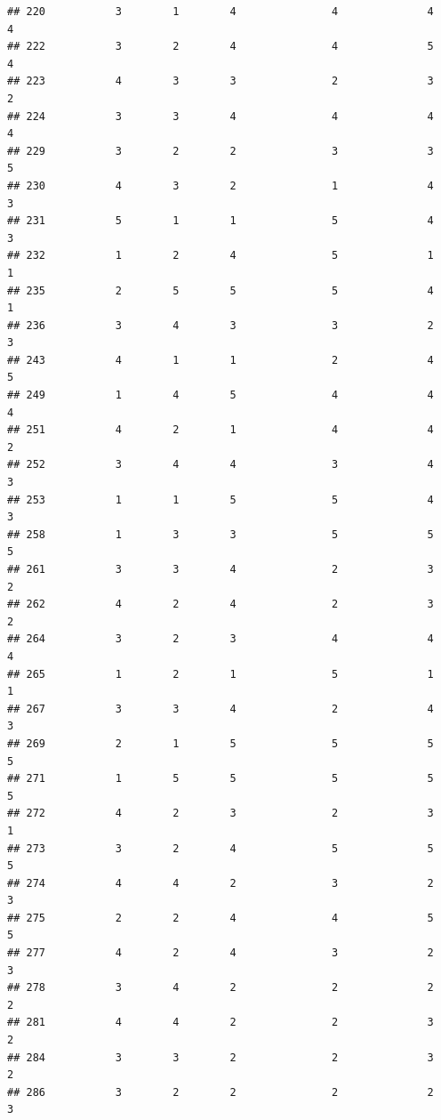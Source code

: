 \documentclass[
]{article}
\begin{document}
\begin{verbatim}
## 220           3        1        4               4              4             4
## 222           3        2        4               4              5             4
## 223           4        3        3               2              3             2
## 224           3        3        4               4              4             4
## 229           3        2        2               3              3             5
## 230           4        3        2               1              4             3
## 231           5        1        1               5              4             3
## 232           1        2        4               5              1             1
## 235           2        5        5               5              4             1
## 236           3        4        3               3              2             3
## 243           4        1        1               2              4             5
## 249           1        4        5               4              4             4
## 251           4        2        1               4              4             2
## 252           3        4        4               3              4             3
## 253           1        1        5               5              4             3
## 258           1        3        3               5              5             5
## 261           3        3        4               2              3             2
## 262           4        2        4               2              3             2
## 264           3        2        3               4              4             4
## 265           1        2        1               5              1             1
## 267           3        3        4               2              4             3
## 269           2        1        5               5              5             5
## 271           1        5        5               5              5             5
## 272           4        2        3               2              3             1
## 273           3        2        4               5              5             5
## 274           4        4        2               3              2             3
## 275           2        2        4               4              5             5
## 277           4        2        4               3              2             3
## 278           3        4        2               2              2             2
## 281           4        4        2               2              3             2
## 284           3        3        2               2              3             2
## 286           3        2        2               2              2             3

\end{verbatim}
\end{document}
